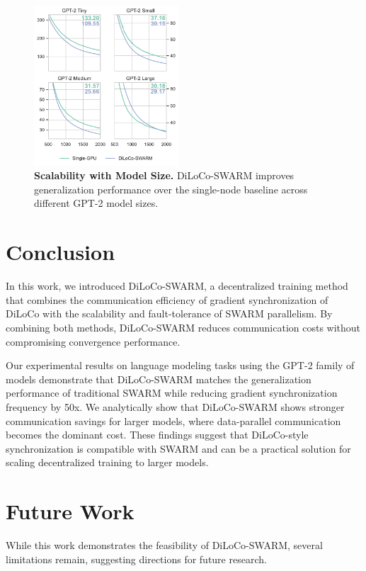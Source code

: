 \documentclass{article}
\begin{document}
\begin{figure}[ht]
  \centering
  \includegraphics[width=0.48\textwidth]{figures/experiment3.pdf}
  \caption{\textbf{Scalability with Model Size.} DiLoCo-SWARM improves
  generalization performance over the single-node baseline across different
  GPT-2 model sizes.}
  \label{fig:experiment3}
\end{figure}

\section{Conclusion}

In this work, we introduced DiLoCo-SWARM, a decentralized training method that combines the communication efficiency of gradient synchronization of DiLoCo with the scalability and fault-tolerance of SWARM parallelism. By combining both methods, DiLoCo-SWARM reduces communication costs without compromising convergence performance.

Our experimental results on language modeling tasks using the GPT-2 family of models demonstrate that DiLoCo-SWARM matches the generalization performance of traditional SWARM while reducing gradient synchronization frequency by 50x. We analytically show that DiLoCo-SWARM shows stronger communication savings for larger models, where data-parallel communication becomes the dominant cost. These findings suggest that DiLoCo-style synchronization is compatible with SWARM and can be a practical solution for scaling decentralized training to larger models.

\section{Future Work}

While this work demonstrates the feasibility of DiLoCo-SWARM, several limitations remain, suggesting directions for future research.
\end{document}
